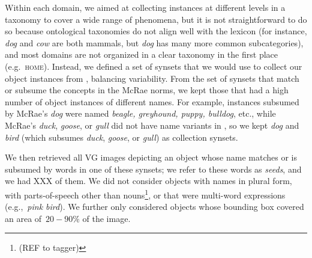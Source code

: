 Within each domain, we aimed at collecting instances at different levels in a taxonomy to cover a wide range of phenomena, but it is not straightforward to do so because ontological taxonomies do not align well with the lexicon (for instance, \textit{dog} and \textit{cow} are both mammals, but \textit{dog} has many more common subcategories), and most domains are not organized in a clear taxonomy in the first place (e.g.\ \textsc{home}).
Instead, we defined a set of synsets that we would use to collect our object instances from \vgenome, balancing variability.
From the set of synsets that match or subsume the concepts in the McRae norms, we kept those that had a high number of \vgenome object instances of different names.
For example, \vgenome instances subsumed by McRae's \textsl{dog} were named \textsl{beagle, greyhound, puppy, bulldog}, etc., while McRae's \textsl{duck}, \textsl{goose}, or \textsl{gull} did not have name variants in \vgenome, so we kept \textsl{dog} and \textsl{bird} (which subsumes \textsl{duck}, \textsl{goose}, or \textsl{gull}) as collection synsets.

We then retrieved all VG images depicting an object whose name matches or is subsumed by words in one of these synsets; we refer to these words as \textit{seeds}, and we had XXX of them.
We did not consider objects with names in plural form, with parts-of-speech other than nouns\footnote{(REF to tagger)}, or that were multi-word expressions (e.g.,~\textsl{pink bird}). 
We further only considered objects whose bounding box covered an area of~$20-90\%$ of the image.


